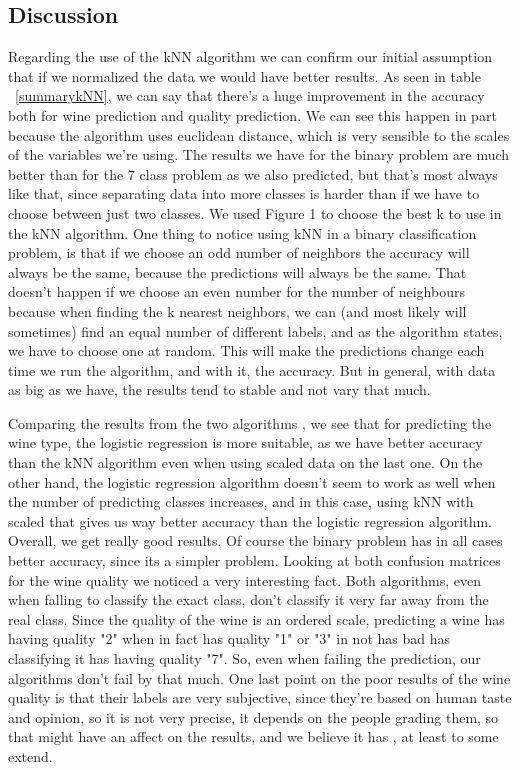\documentclass[twoside]{article}
\begin{document}
\begin{multicols}{2}
\section{Discussion}%
\indent \par
Regarding the use of the kNN algorithm we can confirm our initial assumption that if we normalized the data we would have better results. As seen in table ~\ref{summarykNN}, we can say that there's a huge improvement in the accuracy both for wine prediction and quality prediction. We can see this happen in part because the algorithm uses euclidean distance, which is very sensible to the scales of the variables we're using. The results we have for the binary problem are much better than for the 7 class problem as we also predicted, but that's most always like that, since separating data into more classes is harder than if we have to choose between just two classes. We used Figure 1  to choose the best k to use in the kNN algorithm. One thing to notice using kNN in a binary classification problem, is that if we choose an odd number of neighbors the accuracy will always be the same, because the predictions will always be the same. That doesn't happen if we choose an even number for the number of neighbours because when finding the k nearest neighbors, we can (and most likely will sometimes) find an equal number of different labels, and as the algorithm states, we have to choose one at random. This will make the predictions change each time we run the algorithm, and with it, the accuracy. But in general, with data as big as we have, the results tend to stable and not vary that much. 
\par
Comparing the results from the two algorithms , we see that for predicting the wine type, the logistic regression is more suitable, as we have better accuracy than the kNN algorithm even when using scaled data on the last one. On the other hand, the logistic regression algorithm doesn't seem to work as well when the number of predicting classes increases, and in this case, using kNN with scaled that gives us way better accuracy than the logistic regression algorithm. Overall, we get really good results. Of course the binary problem has in all cases better accuracy, since its a simpler problem. Looking at both confusion matrices for the wine quality we noticed a very interesting fact. Both algorithms, even when falling to classify the exact class, don't classify it very far away from the real class. Since the quality of the wine is an ordered scale, predicting a wine has having quality "2" when in fact has quality "1" or "3" in not has bad has classifying it has having quality "7". So, even when failing the prediction, our algorithms don't fail by that much. One last point on the poor results of the wine quality is that their labels are very subjective, since they're based on human taste and opinion, so it is not very precise, it depends on the people grading them, so that might have an affect on the results, and we believe it has , at least to some extend.

\end{multicols}
\end{document}
